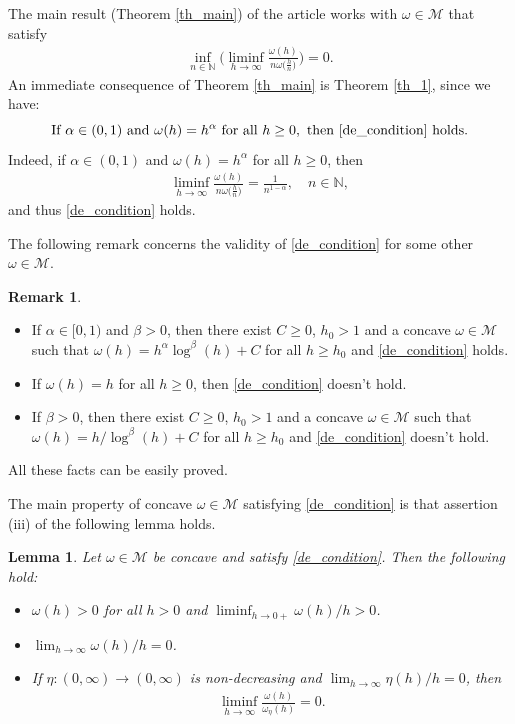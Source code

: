 \documentclass[10pt,a4paper]{amsart}
\newtheorem{lemma}[theorem]{Lemma}
\theoremstyle{definition}
\newtheorem{remark}[theorem]{Remark}
\newcommand{\N}{\mathbb{N}}
\newcommand{\M}{\mathcal{M}}
\begin{document}
The main result (Theorem \ref{th_main}) of the article works with $ \omega\in\M $ that satisfy 
\begin{align}\label{de_condition}
\inf_{n\in\N}\bigg(\liminf_{h\to\infty}\frac{\omega(h)}{n\omega\big(\frac{h}{n}\big)}\bigg)=0.\tag{*} 
\end{align}
An immediate consequence of Theorem \ref{th_main} is Theorem \ref{th_1}, since we have:
\begin{equation}\label{eq_condition}
\textnormal{If }\alpha\in (0,1)\textnormal{ and }\omega(h)=h^{\alpha}\textnormal{ for all }h\geq 0,\textnormal{ then }\eqref{de_condition}\textnormal{ holds}.
\end{equation}
Indeed, if $ \alpha\in (0,1) $ and $ \omega(h)=h^{\alpha} $ for all $ h\geq 0 $, then
\begin{align*}
\liminf_{h\to\infty}\frac{\omega(h)}{n\omega\big(\frac{h}{n}\big)}=\frac{1}{n^{1-\alpha}} ,\quad n\in\N,
\end{align*}
and thus \eqref{de_condition} holds.


The following remark concerns the validity of \eqref{de_condition} for some other $ \omega\in\M $.

\begin{remark}\label{re_condition}
\hfill
\begin{itemize}
\item[(i)] If $ \alpha\in [0,1) $ and $ \beta>0 $, then there exist $ C\geq 0 $, $ h_0>1 $ and a concave $ \omega\in\M $ such that $ \omega(h)=h^{\alpha}\log^{\beta}(h)+C $ for all $ h\geq h_0 $ and \eqref{de_condition} holds.
\item[(ii)] If $ \omega(h)=h $ for all $ h\geq 0 $, then \eqref{de_condition} doesn't hold.
\item[(iii)] If $ \beta>0 $, then there exist $ C\geq 0 $, $ h_0>1 $ and a concave $ \omega\in\M $ such that $ \omega(h)=h/\log^{\beta}(h)+C $ for all $ h\geq h_0 $ and   \eqref{de_condition} doesn't hold.
\end{itemize}
All these facts can be easily proved.
\end{remark}



The main property of concave $ \omega\in\M $ satisfying \eqref{de_condition} is that assertion (iii) of the following lemma holds.

\begin{lemma}\label{le_condition}
Let $ \omega\in\M $ be concave and satisfy \eqref{de_condition}. Then the following hold: 
\begin{itemize}
\item[(i)] $ \omega(h)>0 $ for all $ h>0 $ and $ \liminf_{h\to 0+}\omega(h)/h>0 $.
\item[(ii)] $ \lim_{h\to\infty}\omega(h)/h=0 $.
\item[(iii)] If $ \eta:(0,\infty)\to(0,\infty) $ is non-decreasing and $ \lim_{h\to\infty}\eta(h)/h=0 $, then 
\begin{align}\label{eq_liminf}
\liminf_{h\to\infty}\frac{\omega(h)}{\omega_{\eta}(h)}=0.
\end{align}
\end{itemize}
\end{lemma}
\end{document}
